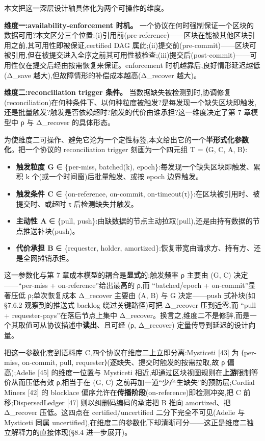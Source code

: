 \documentclass[UTF8,fontset=windows,a4paper,11pt]{ctexart}
\providecommand{\tightlist}{\setlength{\itemsep}{0pt}\setlength{\parskip}{0pt}}
\begin{document}
本文把这一深层设计轴具体化为两个可操作的维度。

\textbf{维度一:availability-enforcement 时机。}
一个协议在何时强制保证一个区块的数据可用?本文区分三个位置:(i)引用前(pre-reference)------区块在能被其他区块引用之前,其可用性即被保证,certified
DAG
属此;(ii)提交前(pre-commit)------区块可被引用,但在被提交进入全序之前其可用性被检查;(iii)提交后(post-commit)------可用性仅在提交后经由按需恢复来保证。enforcement
时机越靠后,良好情形延迟越低(Δ\_save
越大),但故障情形的补偿成本越高(Δ\_recover 越大)。

\textbf{维度二:reconciliation trigger 条件。}
当数据缺失被检测到时,协调修复(reconciliation)在何种条件下、以何种粒度被触发?是每发现一个缺失区块即触发,还是批量触发?触发是否依赖超时?触发的代价由谁承担?这一维度决定了第
7 章模型中 ρ 与 Δ\_recover 的具体形态。

为使维度二可操作、避免它沦为一个定性标签,本文给出它的一个\textbf{半形式化参数化}。把一个协议的
reconciliation trigger 刻画为一个四元组 T = ⟨G, C, A, B⟩:

\begin{itemize}
\tightlist
\item
  \textbf{触发粒度 G} ∈ \{per-miss, batched(k),
  epoch\}:每发现一个缺失区块即触发、累积 k
  个(或一个时间窗)后批量触发、或按 epoch 边界触发。
\item
  \textbf{触发条件 C} ∈ \{on-reference, on-commit,
  on-timeout(τ)\}:在区块被引用时、被提交时、或超时 τ
  后检测缺失并触发。
\item
  \textbf{主动性 A} ∈ \{pull, push\}:由缺数据的节点主动拉取(pull),还是由持有数据的节点推送补块(push)。
\item
  \textbf{代价承担 B} ∈ \{requester, holder,
  amortized\}:恢复带宽由请求方、持有方、还是全网摊销承担。
\end{itemize}

这一参数化与第 7 章成本模型的耦合是\textbf{显式}的:触发频率 ρ
主要由 (G, C) 决定------``per-miss + on-reference''给出最高的 ρ,而
``batched/epoch + on-commit''显著压低 ρ;单次恢复成本 Δ\_recover
主要由 (A, B) 与 G 决定------push 式补块(如 §7.6.2
观察到的推送式 backlog 绕过关键路径)可把 Δ\_recover 压到近零,而
``pull + requester-pays''在落后节点上集中 Δ\_recover。换言之,维度二不是修辞,而是一个其取值可从协议描述中\textbf{读出}、且可经
(ρ, Δ\_recover) 定量传导到延迟的设计向量。

把这一参数化套到语料库 C,四个协议在维度二上立即分离:Mysticeti
{[}43{]} 为 ⟨per-miss, on-commit, pull,
requester⟩(逐缺失、提交时触发的按需拉取,故 ρ 偏高);Adelie {[}45{]}
的维度一位置与 Mysticeti 相近,却通过区块视图规则在\textbf{上游}限制等价从而压低有效
ρ,相当于在 (G, C) 之前再加一道``少产生缺失''的预防层;Cordial Miners
{[}42{]} 的 blocklace 偏序允许在\textbf{传播阶段}(on-reference)即检测冲突,把
C 前移;DispersedLedger {[}47{]} 则以纠删码编码的承诺把 B 推向
amortized、把 Δ\_recover
压低。这四点在 certified/uncertified 二分下完全不可见(Adelie 与 Mysticeti
同属 uncertified),在维度二的参数化下却清晰可分------这正是维度二独立解释力的直接体现(§8.4
进一步展开)。
\end{document}
